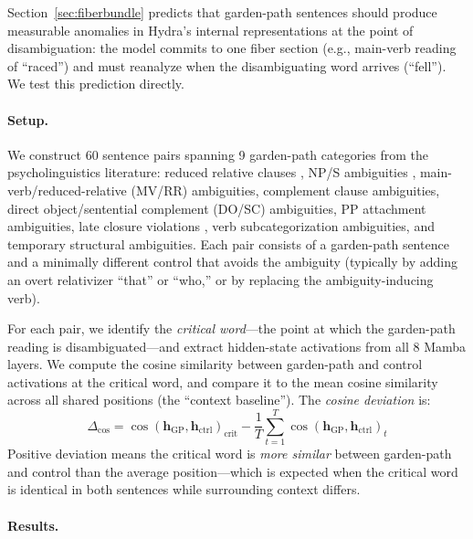 \documentclass[11pt]{article}
\begin{document}
Section~\ref{sec:fiberbundle} predicts that garden-path sentences should 
produce measurable anomalies in Hydra's internal representations at the 
point of disambiguation: the model commits to one fiber section (e.g., 
main-verb reading of ``raced'') and must reanalyze when the disambiguating 
word arrives (``fell''). We test this prediction directly.

\paragraph{Setup.}
We construct 60 sentence pairs spanning 9 garden-path categories from 
the psycholinguistics literature: reduced relative clauses 
\cite{bever1970cognitive}, NP/S ambiguities \cite{frazier1982making}, 
main-verb/reduced-relative (MV/RR) ambiguities, complement clause 
ambiguities, direct object/sentential complement (DO/SC) ambiguities, 
PP attachment ambiguities, late closure violations \cite{frazier1979parsing}, 
verb subcategorization ambiguities, and temporary structural ambiguities. 
Each pair consists of a garden-path sentence and a minimally different 
control that avoids the ambiguity (typically by adding an overt relativizer 
``that'' or ``who,'' or by replacing the ambiguity-inducing verb).

For each pair, we identify the \emph{critical word}---the point at which 
the garden-path reading is disambiguated---and extract hidden-state 
activations from all 8 Mamba layers. We compute the cosine similarity 
between garden-path and control activations at the critical word, and 
compare it to the mean cosine similarity across all shared positions 
(the ``context baseline''). The \emph{cosine deviation} is:
\begin{equation}
\Delta_{\cos} = \cos(\mathbf{h}_{\text{GP}}, \mathbf{h}_{\text{ctrl}})_{\text{crit}} 
- \frac{1}{T}\sum_{t=1}^{T} \cos(\mathbf{h}_{\text{GP}}, \mathbf{h}_{\text{ctrl}})_t
\end{equation}
Positive deviation means the critical word is \emph{more similar} between 
garden-path and control than the average position---which is expected 
when the critical word is identical in both sentences while surrounding 
context differs.

\paragraph{Results.}
\end{document}
